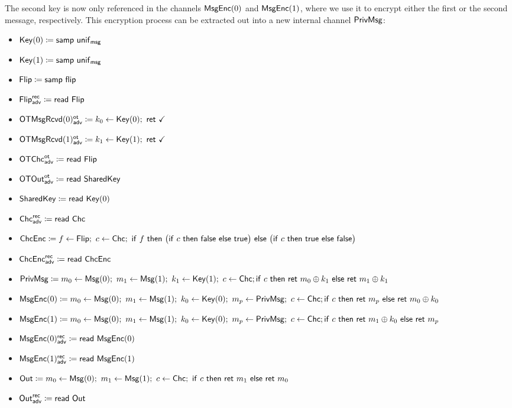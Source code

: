 \noindent The second key is now only referenced in the channels $\mathsf{MsgEnc}(0)$ and $\mathsf{MsgEnc}(1)$, where we use it to encrypt either the first or the second message, respectively. This encryption process can be extracted out into a new internal channel $\mathsf{PrivMsg}$:

\begin{itemize}
\item $\mathsf{Key}(0) \coloneqq \mathsf{samp} \ \mathsf{unif}_{\mathsf{msg}}$
\item $\mathsf{Key}(1) \coloneqq \mathsf{samp} \ \mathsf{unif}_{\mathsf{msg}}$
\item $\mathsf{Flip} \coloneqq \mathsf{samp} \ \mathsf{flip}$
\item {\color{blue} $\mathsf{Flip}^{\mathsf{rec}}_{\mathsf{adv}} \coloneqq \mathsf{read} \ \mathsf{Flip}$}
\item {\color{blue} $\LeakOTMsgRcvd(0)^\ot_\adv \coloneqq k_0 \leftarrow \Key(0); \ \ret{\checkmark}$}
\item {\color{blue} $\LeakOTMsgRcvd(1)^\ot_\adv \coloneqq k_1 \leftarrow \Key(1); \ \ret{\checkmark}$}
\item {\color{blue} $\mathsf{OTChc}^{\mathsf{ot}}_{\mathsf{adv}} \coloneqq \mathsf{read} \ \mathsf{Flip}$}
\item {\color{blue} $\mathsf{OTOut}^{\mathsf{ot}}_{\mathsf{adv}} \coloneqq \mathsf{read} \ \mathsf{SharedKey}$}
\item $\mathsf{SharedKey} \coloneqq \mathsf{read} \ \mathsf{Key}(0)$
\item {\color{blue} $\mathsf{Chc}^{\mathsf{rec}}_{\mathsf{adv}} \coloneqq \mathsf{read} \ \mathsf{Chc}$}
\item $\ChcEnc \coloneqq f \leftarrow \Flip; \ c \leftarrow \Chc; \ \ifte{f}{\big(\ifte{c}{\false}{\true}\big)}{\big(\ifte{c}{\true}{\false}\big)}$
\item {\color{blue} $\mathsf{ChcEnc}^{\mathsf{rec}}_{\mathsf{adv}} \coloneqq \mathsf{read} \ \mathsf{ChcEnc}$}
\item {\color{red} $\mathsf{PrivMsg} \coloneqq m_0 \leftarrow \mathsf{Msg}(0); \ m_1 \leftarrow \mathsf{Msg}(1); \ k_1 \leftarrow \mathsf{Key}(1); \ c \leftarrow \mathsf{Chc}; \\ \mathsf{if} \ c \ \mathsf{then} \ \mathsf{ret} \ m_0 \oplus k_1 \ \mathsf{else} \ \mathsf{ret} \ m_1 \oplus k_1$}
\item {\color{red} $\mathsf{MsgEnc}(0) \coloneqq m_0 \leftarrow \mathsf{Msg}(0); \ m_1 \leftarrow \mathsf{Msg}(1); \ k_0 \leftarrow \mathsf{Key}(0); \ m_p \leftarrow \mathsf{PrivMsg}; \ c \leftarrow \mathsf{Chc}; \\ \mathsf{if} \ c \ \mathsf{then} \ \mathsf{ret} \ m_p \ \mathsf{else} \ \mathsf{ret} \ m_0 \oplus k_0$}
\item {\color{red} $\mathsf{MsgEnc}(1) \coloneqq m_0 \leftarrow \mathsf{Msg}(0); \ m_1 \leftarrow \mathsf{Msg}(1); \ k_0 \leftarrow \mathsf{Key}(0); \ m_p \leftarrow \mathsf{PrivMsg}; \ c \leftarrow \mathsf{Chc}; \\ \mathsf{if} \ c \ \mathsf{then} \ \mathsf{ret} \ m_1 \oplus k_0 \ \mathsf{else} \ \mathsf{ret} \ m_p$}
\item {\color{blue} $\mathsf{MsgEnc}(0)^{\mathsf{rec}}_{\mathsf{adv}} \coloneqq \mathsf{read} \ \mathsf{MsgEnc}(0)$}
\item {\color{blue} $\mathsf{MsgEnc}(1)^{\mathsf{rec}}_{\mathsf{adv}} \coloneqq \mathsf{read} \ \mathsf{MsgEnc}(1)$}
\item $\Out \coloneqq m_0 \leftarrow \Msg(0); \ m_1 \leftarrow \Msg(1); \ c \leftarrow \Chc; \ \ifte{c}{\ret{m_1}}{\ret{m_0}}$
\item {\color{blue} $\mathsf{Out}^{\mathsf{rec}}_{\mathsf{adv}} \coloneqq \mathsf{read} \ \mathsf{Out}$}
\end{itemize}

